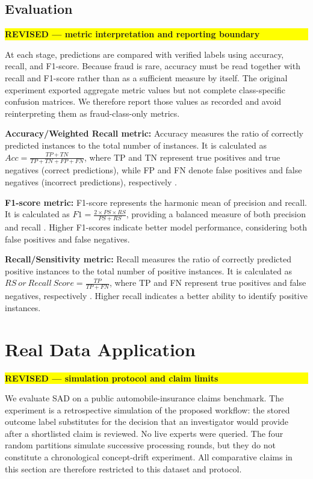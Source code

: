 \documentclass[12pt]{article}
\newcommand{\revmark}[1]{\par\noindent\colorbox{yellow}{%
  \parbox{\dimexpr\linewidth-2\fboxsep}{\raggedright\strut\textbf{#1}}}%
  \par\smallskip}
\begin{document}
\subsection{Evaluation}\label{SSC:EVAL}
\revmark{REVISED --- metric interpretation and reporting boundary}
At each stage, predictions are compared with verified labels using accuracy,
recall, and F1-score. Because fraud is rare, accuracy must be read together
with recall and F1-score rather than as a sufficient measure by itself. The
original experiment exported aggregate metric values but not complete
class-specific confusion matrices. We therefore report those values as
recorded and avoid reinterpreting them as fraud-class-only metrics.

\textbf{\small Accuracy/Weighted Recall metric:} Accuracy measures
the ratio of correctly predicted instances to the total number of
instances. It is calculated as $Acc=\frac{TP+TN}{TP+TN+FP+FN}$,
where TP and TN represent true positives and true negatives
(correct predictions), while FP and FN denote false positives and
false negatives (incorrect predictions), respectively \cite{A3}.

\textbf{\small F1-score  metric:} F1-score represents the harmonic
mean of precision and recall. It is calculated as
$F1=\frac{2\times P S\times R S}{PS+RS}$, providing a balanced
measure of both precision and recall \cite{A3}. Higher
F1-scores indicate better model performance, considering both
false positives and false negatives.

    \textbf{Recall/Sensitivity  metric:} Recall measures the ratio of correctly predicted positive
instances to the total number of positive instances. It is
calculated as $RS\ or\ Recall\ Score=\frac{TP}{TP+FN}$, where TP
and FN represent true positives and false negatives, respectively
\cite{A3}. Higher recall indicates a better
ability to identify positive instances.


\section{Real Data Application}\label{SC:RESULT}
\revmark{REVISED --- simulation protocol and claim limits}
We evaluate SAD on a public automobile-insurance claims benchmark. The
experiment is a retrospective simulation of the proposed workflow: the stored
outcome label substitutes for the decision that an investigator would provide
after a shortlisted claim is reviewed. No live experts were queried. The four
random partitions simulate successive processing rounds, but they do not
constitute a chronological concept-drift experiment. All comparative claims in
this section are therefore restricted to this dataset and protocol.
\end{document}
